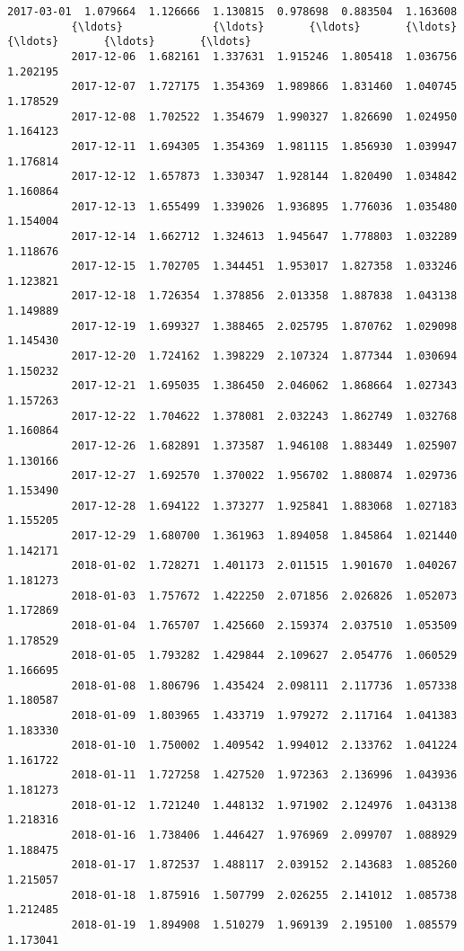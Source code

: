 \documentclass[11pt]{article}
\begin{document}
\begin{Verbatim}[commandchars=\\\{\}]
          2017-03-01  1.079664  1.126666  1.130815  0.978698  0.883504  1.163608   
          {\ldots}              {\ldots}       {\ldots}       {\ldots}       {\ldots}       {\ldots}       {\ldots}   
          2017-12-06  1.682161  1.337631  1.915246  1.805418  1.036756  1.202195   
          2017-12-07  1.727175  1.354369  1.989866  1.831460  1.040745  1.178529   
          2017-12-08  1.702522  1.354679  1.990327  1.826690  1.024950  1.164123   
          2017-12-11  1.694305  1.354369  1.981115  1.856930  1.039947  1.176814   
          2017-12-12  1.657873  1.330347  1.928144  1.820490  1.034842  1.160864   
          2017-12-13  1.655499  1.339026  1.936895  1.776036  1.035480  1.154004   
          2017-12-14  1.662712  1.324613  1.945647  1.778803  1.032289  1.118676   
          2017-12-15  1.702705  1.344451  1.953017  1.827358  1.033246  1.123821   
          2017-12-18  1.726354  1.378856  2.013358  1.887838  1.043138  1.149889   
          2017-12-19  1.699327  1.388465  2.025795  1.870762  1.029098  1.145430   
          2017-12-20  1.724162  1.398229  2.107324  1.877344  1.030694  1.150232   
          2017-12-21  1.695035  1.386450  2.046062  1.868664  1.027343  1.157263   
          2017-12-22  1.704622  1.378081  2.032243  1.862749  1.032768  1.160864   
          2017-12-26  1.682891  1.373587  1.946108  1.883449  1.025907  1.130166   
          2017-12-27  1.692570  1.370022  1.956702  1.880874  1.029736  1.153490   
          2017-12-28  1.694122  1.373277  1.925841  1.883068  1.027183  1.155205   
          2017-12-29  1.680700  1.361963  1.894058  1.845864  1.021440  1.142171   
          2018-01-02  1.728271  1.401173  2.011515  1.901670  1.040267  1.181273   
          2018-01-03  1.757672  1.422250  2.071856  2.026826  1.052073  1.172869   
          2018-01-04  1.765707  1.425660  2.159374  2.037510  1.053509  1.178529   
          2018-01-05  1.793282  1.429844  2.109627  2.054776  1.060529  1.166695   
          2018-01-08  1.806796  1.435424  2.098111  2.117736  1.057338  1.180587   
          2018-01-09  1.803965  1.433719  1.979272  2.117164  1.041383  1.183330   
          2018-01-10  1.750002  1.409542  1.994012  2.133762  1.041224  1.161722   
          2018-01-11  1.727258  1.427520  1.972363  2.136996  1.043936  1.181273   
          2018-01-12  1.721240  1.448132  1.971902  2.124976  1.043138  1.218316   
          2018-01-16  1.738406  1.446427  1.976969  2.099707  1.088929  1.188475   
          2018-01-17  1.872537  1.488117  2.039152  2.143683  1.085260  1.215057   
          2018-01-18  1.875916  1.507799  2.026255  2.141012  1.085738  1.212485   
          2018-01-19  1.894908  1.510279  1.969139  2.195100  1.085579  1.173041   
          

\end{Verbatim}
\end{document}
